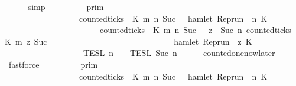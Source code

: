 \begin{isabellebody}
\ \ \ \ \isamarkupfalse%
\ simp\isanewline
\ \ \isamarkupfalse%
\ \isamarkupfalse%
\ {\isacartoucheopen}{\isachardot}{\isachardot}{\isachardot}\ {\isacharequal}\ {\isasymlbrakk}{\isasymlbrakk}\ {\isasymGamma}\ {\isasymrbrakk}{\isasymrbrakk}\isactrlsub p\isactrlsub r\isactrlsub i\isactrlsub m\ \isanewline
\ \ \ \ \ \ \ \ \ \ \ \ \ \ \ \ {\isasyminter}\ {\isacharbraceleft}{\isasymrho}{\isachardot}\ {\isacharparenleft}{\isasymnot}counted{\isacharunderscore}ticks\ {\isasymrho}\ K\ m\ n\ {\isacharparenleft}Suc\ {}{\isacharparenright}\ {\isasymor}\ hamlet\ {\isacharparenleft}{\isacharparenleft}Rep{\isacharunderscore}run\ {\isasymrho}{\isacharparenright}\ n\ K\isanewline
\ \ \ \ \ \ \ \ \ \ \ \ \ \ \ \ \ \ \ \ \ \ {\isasymand}\ {\isacharparenleft}counted{\isacharunderscore}ticks\ {\isasymrho}\ K\ m\ n\ {\isacharparenleft}Suc\ {}{\isacharparenright}\ {\isasymor}\ {\isacharparenleft}{\isasymforall}z\ {\isasymge}\ Suc\ n{\isachardot}\ {\isacharparenleft}counted{\isacharunderscore}ticks\ {\isasymrho}\ K\ m\ z\ {\isacharparenleft}Suc\ {}{\isacharparenright}{\isacharparenright}\isanewline
\ \ \ \ \ \ \ \ \ \ \ \ \ \ \ \ \ \ \ \ \ \ \ \ \ \ \ \ {\isasymlongrightarrow}\ hamlet\ {\isacharparenleft}{\isacharparenleft}Rep{\isacharunderscore}run\ {\isasymrho}{\isacharparenright}\ z\ K\ {\isacharbraceright}\isanewline
\ \ \ \ \ \ \ \ \ \ \ \ \ \ \ \ {\isasyminter}\ {\isasymlbrakk}{\isasymlbrakk}\ {\isasymPsi}\ {\isasymrbrakk}{\isasymrbrakk}\isactrlsub T\isactrlsub E\isactrlsub S\isactrlsub L\isactrlbsup {\isasymge}\ n\isactrlesup \ {\isasyminter}\ {\isasymlbrakk}{\isasymlbrakk}\ {\isasymPhi}\ {\isasymrbrakk}{\isasymrbrakk}\isactrlsub T\isactrlsub E\isactrlsub S\isactrlsub L\isactrlbsup {\isasymge}\ Suc\ n\isactrlesup {\isacartoucheclose}\isanewline
\ \ \ \ \isamarkupfalse%
\ counted{\isacharunderscore}one{\isacharunderscore}now{\isacharunderscore}later\ \isamarkupfalse%
\ fastforce\isanewline
\ \ \isamarkupfalse%
\ \isamarkupfalse%
\ {\isacartoucheopen}{\isachardot}{\isachardot}{\isachardot}\ {\isacharequal}\ {\isasymlbrakk}{\isasymlbrakk}\ {\isasymGamma}\ {\isasymrbrakk}{\isasymrbrakk}\isactrlsub p\isactrlsub r\isactrlsub i\isactrlsub m\ \isanewline
\ \ \ \ \ \ \ \ \ \ \ \ \ \ \ \ {\isasyminter}\ {\isacharbraceleft}{\isasymrho}{\isachardot}\ {\isacharparenleft}{\isasymnot}counted{\isacharunderscore}ticks\ {\isasymrho}\ K\ m\ n\ {\isacharparenleft}Suc\ {}{\isacharparenright}\ {\isasymor}\ hamlet\ {\isacharparenleft}{\isacharparenleft}Rep{\isacharunderscore}run\ {\isasymrho}{\isacharparenright}\ n\ K\isanewline

\end{isabellebody}
